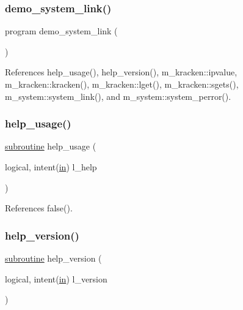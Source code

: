 \subsubsection{\texorpdfstring{demo\+\_\+system\+\_\+link()}{demo\_system\_link()}}
{\footnotesize\ttfamily program demo\+\_\+system\+\_\+link (\begin{DoxyParamCaption}{ }\end{DoxyParamCaption})}



References help\+\_\+usage(), help\+\_\+version(), m\+\_\+kracken\+::ipvalue, m\+\_\+kracken\+::kracken(), m\+\_\+kracken\+::lget(), m\+\_\+kracken\+::sgets(), m\+\_\+system\+::system\+\_\+link(), and m\+\_\+system\+::system\+\_\+perror().

\mbox{\label{__ln_8f90_a3e09a3b52ee8fb04eeb93fe5761626a8}} 
\subsubsection{\texorpdfstring{help\+\_\+usage()}{help\_usage()}}
{\footnotesize\ttfamily \hyperlink{M__stopwatch_83_8txt_acfbcff50169d691ff02d4a123ed70482}{subroutine} help\+\_\+usage (\begin{DoxyParamCaption}\item[{logical, intent(\hyperlink{M__journal_83_8txt_afce72651d1eed785a2132bee863b2f38}{in})}]{l\+\_\+help }\end{DoxyParamCaption})}



References false().

\mbox{\label{__ln_8f90_a39c21619b08a3c22f19e2306efd7f766}} 
\subsubsection{\texorpdfstring{help\+\_\+version()}{help\_version()}}
{\footnotesize\ttfamily \hyperlink{M__stopwatch_83_8txt_acfbcff50169d691ff02d4a123ed70482}{subroutine} help\+\_\+version (\begin{DoxyParamCaption}\item[{logical, intent(\hyperlink{M__journal_83_8txt_afce72651d1eed785a2132bee863b2f38}{in})}]{l\+\_\+version }\end{DoxyParamCaption})}




